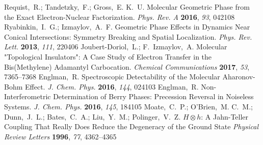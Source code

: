 \documentclass[superscriptaddress,showpacs,amsmath,amssymb,pra,twocolumn]{revtex4-1}
\begin{document}
\begin{thebibliography}{61}
\EndOfBibitem
{}
Requist,~R.; Tandetzky,~F.; Gross,~E. K.~U. Molecular Geometric Phase from the
  Exact Electron-Nuclear Factorization. \emph{Phys. Rev. A} \textbf{2016},
  \emph{93}, 042108\relax
\mciteBstWouldAddEndPuncttrue
\mciteSetBstMidEndSepPunct{\mcitedefaultmidpunct}
{\mcitedefaultendpunct}{\mcitedefaultseppunct}\relax
\EndOfBibitem
{}
Ryabinkin,~I.~G.; Izmaylov,~A.~F. Geometric {{Phase Effects}} in {{Dynamics
  Near Conical Intersections}}: {{Symmetry Breaking}} and {{Spatial
  Localization}}. \emph{Phys. Rev. Lett.} \textbf{2013}, \emph{111},
  220406\relax
\mciteBstWouldAddEndPuncttrue
\mciteSetBstMidEndSepPunct{\mcitedefaultmidpunct}
{\mcitedefaultendpunct}{\mcitedefaultseppunct}\relax
\EndOfBibitem
{}
Joubert-Doriol,~L.; F.~Izmaylov,~A. Molecular "Topological Insulators": A
  Case Study of Electron Transfer in the Bis(Methylene) Adamantyl Carbocation.
  \emph{Chemical Communications} \textbf{2017}, \emph{53}, 7365--7368\relax
\mciteBstWouldAddEndPuncttrue
\mciteSetBstMidEndSepPunct{\mcitedefaultmidpunct}
{\mcitedefaultendpunct}{\mcitedefaultseppunct}\relax
\EndOfBibitem
{}
Englman,~R. Spectroscopic Detectability of the Molecular {{Aharonov}}-{{Bohm}}
  Effect. \emph{J. Chem. Phys.} \textbf{2016}, \emph{144},
  024103\relax
\mciteBstWouldAddEndPuncttrue
\mciteSetBstMidEndSepPunct{\mcitedefaultmidpunct}
{\mcitedefaultendpunct}{\mcitedefaultseppunct}\relax
\EndOfBibitem
{}
Englman,~R. Non-Interferometric Determination of {{Berry}} Phases:
  {{Precession}} Reversal in Noiseless Systems. \emph{J. Chem. Phys.} \textbf{2016}, \emph{145}, 184105\relax
\mciteBstWouldAddEndPuncttrue
\mciteSetBstMidEndSepPunct{\mcitedefaultmidpunct}
{\mcitedefaultendpunct}{\mcitedefaultseppunct}\relax
\EndOfBibitem
{}
Moate,~C.~P.; O'Brien,~M. C.~M.; Dunn,~J.~L.; Bates,~C.~A.; Liu,~Y.~M.;
  Polinger,~V.~Z.
 $H\otimes h$: A Jahn-Teller Coupling That Really Does Reduce the Degeneracy of the Ground State  \emph{Physical Review Letters} \textbf{1996}, \emph{77}, 4362--4365\relax
\mciteBstWouldAddEndPuncttrue
\mciteSetBstMidEndSepPunct{\mcitedefaultmidpunct}
{\mcitedefaultendpunct}{\mcitedefaultseppunct}\relax

\end{thebibliography}
\end{document}
